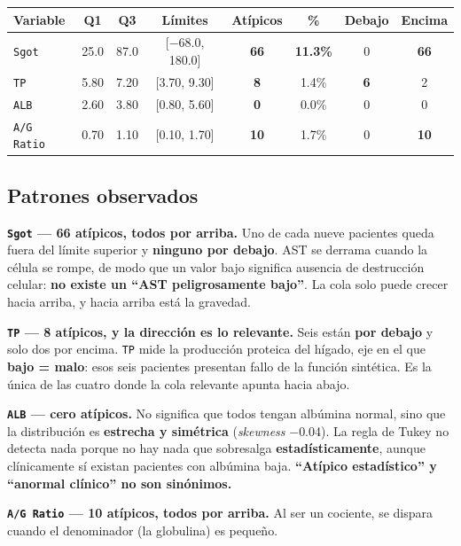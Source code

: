 \documentclass[10pt,a4paper]{article}
\begin{document}
\begin{table}[H]
\footnotesize
\centering
\begin{tabular}{@{}lccccccc@{}}
\toprule
\textbf{Variable} & \textbf{Q1} & \textbf{Q3} & \textbf{Límites} & \textbf{Atípicos} & \textbf{\%} & \textbf{Debajo} & \textbf{Encima} \\
\midrule
\texttt{Sgot} & 25.0 & 87.0 & [$-$68.0, 180.0] & \textbf{66} & \textbf{11.3\%} & 0 & \textbf{66} \\
\texttt{TP} & 5.80 & 7.20 & [3.70, 9.30] & \textbf{8} & 1.4\% & \textbf{6} & 2 \\
\texttt{ALB} & 2.60 & 3.80 & [0.80, 5.60] & \textbf{0} & 0.0\% & 0 & 0 \\
\texttt{A/G Ratio} & 0.70 & 1.10 & [0.10, 1.70] & \textbf{10} & 1.7\% & 0 & \textbf{10} \\
\bottomrule
\end{tabular}
\end{table}

\subsection{Patrones observados}

\textbf{\texttt{Sgot} --- 66 atípicos, todos por arriba.} Uno de cada nueve pacientes queda fuera del límite superior y \textbf{ninguno por debajo}. AST se derrama cuando la célula se rompe, de modo que un valor bajo significa ausencia de destrucción celular: \textbf{no existe un ``AST peligrosamente bajo''}. La cola solo puede crecer hacia arriba, y hacia arriba está la gravedad.

\textbf{\texttt{TP} --- 8 atípicos, y la dirección es lo relevante.} Seis están \textbf{por debajo} y solo dos por encima. \texttt{TP} mide la producción proteica del hígado, eje en el que \textbf{bajo = malo}: esos seis pacientes presentan fallo de la función sintética. Es la única de las cuatro donde la cola relevante apunta hacia abajo.

\textbf{\texttt{ALB} --- cero atípicos.} No significa que todos tengan albúmina normal, sino que la distribución es \textbf{estrecha y simétrica} (\textit{skewness} $-$0.04). La regla de Tukey no detecta nada porque no hay nada que sobresalga \textbf{estadísticamente}, aunque clínicamente sí existan pacientes con albúmina baja. \textbf{``Atípico estadístico'' y ``anormal clínico'' no son sinónimos.}

\textbf{\texttt{A/G Ratio} --- 10 atípicos, todos por arriba.} Al ser un cociente, se dispara cuando el denominador (la globulina) es pequeño.
\end{document}
